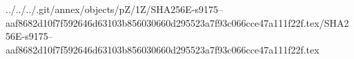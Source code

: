 ../../../.git/annex/objects/pZ/1Z/SHA256E-s9175--aaf8682d10f7f592646d63103b856030660d295523a7f93c066cce47a111f22f.tex/SHA256E-s9175--aaf8682d10f7f592646d63103b856030660d295523a7f93c066cce47a111f22f.tex